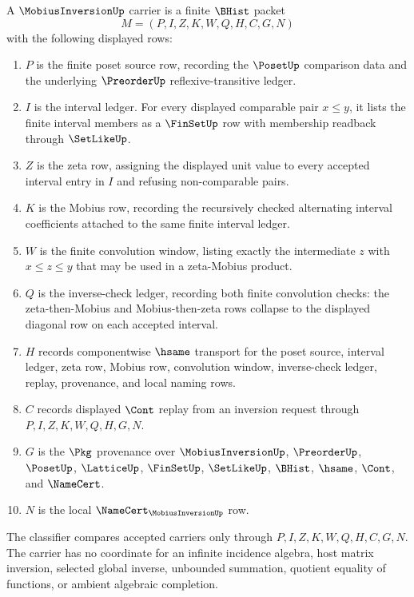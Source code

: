 \begin{definition}
\label{def:mobius-inversion-carrier}
A $\MobiusInversionUp$ carrier is a finite $\BHist$ packet
$$
M=(P,I,Z,K,W,Q,H,C,G,N)
$$
with the following displayed rows:
\begin{enumerate}
\item $P$ is the finite poset source row, recording the $\PosetUp$ comparison data and the underlying $\PreorderUp$ reflexive-transitive ledger.
\item $I$ is the interval ledger. For every displayed comparable pair $x\leq y$, it lists the finite interval members as a $\FinSetUp$ row with membership readback through $\SetLikeUp$.
\item $Z$ is the zeta row, assigning the displayed unit value to every accepted interval entry in $I$ and refusing non-comparable pairs.
\item $K$ is the Mobius row, recording the recursively checked alternating interval coefficients attached to the same finite interval ledger.
\item $W$ is the finite convolution window, listing exactly the intermediate $z$ with $x\leq z\leq y$ that may be used in a zeta-Mobius product.
\item $Q$ is the inverse-check ledger, recording both finite convolution checks: the zeta-then-Mobius and Mobius-then-zeta rows collapse to the displayed diagonal row on each accepted interval.
\item $H$ records componentwise $\hsame$ transport for the poset source, interval ledger, zeta row, Mobius row, convolution window, inverse-check ledger, replay, provenance, and local naming rows.
\item $C$ records displayed $\Cont$ replay from an inversion request through $P,I,Z,K,W,Q,H,G,N$.
\item $G$ is the $\Pkg$ provenance over $\MobiusInversionUp$, $\PreorderUp$, $\PosetUp$, $\LatticeUp$, $\FinSetUp$, $\SetLikeUp$, $\BHist$, $\hsame$, $\Cont$, and $\NameCert$.
\item $N$ is the local $\NameCert_{\MobiusInversionUp}$ row.
\end{enumerate}
The classifier compares accepted carriers only through $P,I,Z,K,W,Q,H,C,G,N$. The carrier has no coordinate for an infinite incidence algebra, host matrix inversion, selected global inverse, unbounded summation, quotient equality of functions, or ambient algebraic completion.
\end{definition}


